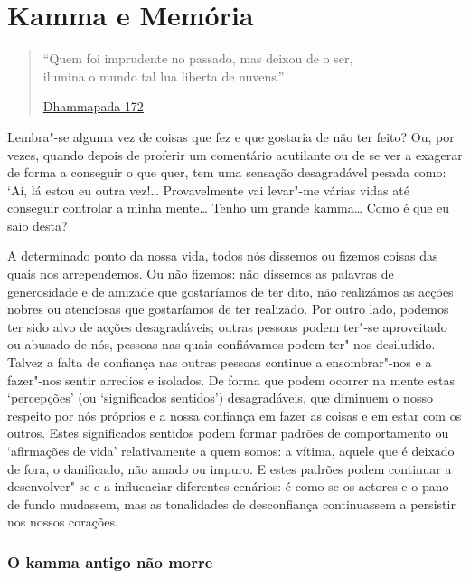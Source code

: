 
\chapter{Kamma e Memória}


\begin{quote}
  ``Quem foi imprudente no passado, mas deixou de o ser,\\
  ilumina o mundo tal lua liberta de nuvens.''

  \href{https://suttacentral.net/dhp167-178/en/buddharakkhita}{Dhammapada 172}
\end{quote}

Lembra"-se alguma vez de coisas que fez e que gostaria de não ter feito? Ou, por
vezes, quando depois de proferir um comentário acutilante ou de se ver a
exagerar de forma a conseguir o que quer, tem uma sensação desagradável pesada
como: `Aí, lá estou eu outra vez!\ldots{} Provavelmente vai levar"-me várias vidas até
conseguir controlar a minha mente\ldots{} Tenho um grande kamma\ldots{} Como é
que eu saio desta?\textquotesingle{}

A determinado ponto da nossa vida, todos nós dissemos ou fizemos coisas das
quais nos arrependemos. Ou não fizemos: não dissemos as palavras de generosidade
e de amizade que gostaríamos de ter dito, não realizámos as acções nobres ou
atenciosas que gostaríamos de ter realizado. Por outro lado, podemos ter sido
alvo de acções desagradáveis; outras pessoas podem ter"-se aproveitado ou abusado
de nós, pessoas nas quais confiávamos podem ter"-nos desiludido. Talvez a falta
de confiança nas outras pessoas continue a \mbox{ensombrar"-nos} e a fazer"-nos
sentir arredios e isolados. De forma que podem ocorrer na mente estas
`percepções' (ou `significados sentidos') desagradáveis, que diminuem o nosso
respeito por nós próprios e a nossa confiança em fazer as coisas e em estar com
os outros. Estes significados sentidos podem formar padrões de comportamento ou
`afirmações de vida' relativamente a quem somos: a vítima, aquele que é deixado
de fora, o danificado, não amado ou impuro. E estes padrões podem continuar a
desenvolver"-se e a influenciar diferentes cenários: é como se os actores e o
pano de fundo mudassem, mas as tonalidades de desconfiança continuassem a
persistir nos nossos corações.

\subsection{O kamma antigo não morre}

